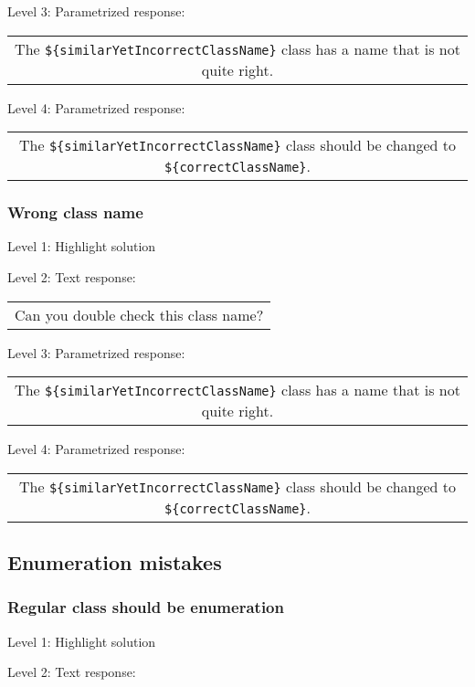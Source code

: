 \noindent Level 3: Parametrized response: \medskip

\begin{tabular}{|c}
The \verb|${similarYetIncorrectClassName}| class has a name that is not quite right.
\end{tabular} \medskip

\noindent Level 4: Parametrized response: \medskip

\begin{tabular}{|c}
The \verb|${similarYetIncorrectClassName}| class should be changed to \verb|${correctClassName}|.
\end{tabular} \medskip


\subsubsection{Wrong class name}

\noindent Level 1: Highlight solution \medskip

\noindent Level 2: Text response: \medskip

\begin{tabular}{|c}
Can you double check this class name?
\end{tabular} \medskip

\noindent Level 3: Parametrized response: \medskip

\begin{tabular}{|c}
The \verb|${similarYetIncorrectClassName}| class has a name that is not quite right.
\end{tabular} \medskip

\noindent Level 4: Parametrized response: \medskip

\begin{tabular}{|c}
The \verb|${similarYetIncorrectClassName}| class should be changed to \verb|${correctClassName}|.
\end{tabular} \medskip


\subsection{Enumeration mistakes}

\subsubsection{Regular class should be enumeration}

\noindent Level 1: Highlight solution \medskip

\noindent Level 2: Text response: \medskip

